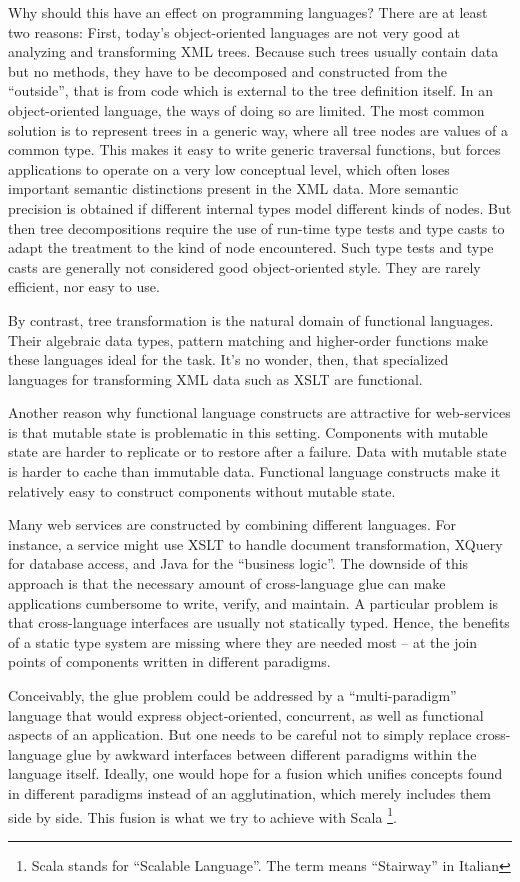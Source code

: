 Why should this have an effect on programming languages? There are at
least two reasons: First, today's object-oriented languages are not
very good at analyzing and transforming XML trees. Because such trees
usually contain data but no methods, they have to be decomposed and
constructed from the ``outside'', that is from code which is external
to the tree definition itself. In an object-oriented language, the
ways of doing so are limited. The most common solution \cite{w3c:dom} is
to represent trees in a generic way, where all tree nodes are values
of a common type.  This makes it easy to write generic traversal
functions, but forces applications to operate on a very low conceptual
level, which often loses important semantic distinctions present in
the XML data.  More semantic precision is obtained if different
internal types model different kinds of nodes.  But then tree
decompositions require the use of run-time type tests and type casts
to adapt the treatment to the kind of node encountered. Such type
tests and type casts are generally not considered good object-oriented
style. They are rarely efficient, nor easy to use.


By contrast, tree transformation is the natural domain of functional
languages. Their algebraic data types, pattern matching and
higher-order functions make these languages ideal for the task. It's
no wonder, then, that specialized languages for transforming XML data
such as XSLT are functional.

Another reason why functional language constructs are attractive for
web-services is that mutable state is problematic in this setting.
Components with mutable state are harder to replicate or to restore
after a failure. Data with mutable state is harder to cache than
immutable data. Functional language constructs make it relatively easy
to construct components without mutable state.

Many web services are constructed by combining different languages.
For instance, a service might use XSLT to handle document
transformation, XQuery for database access, and Java for the
``business logic''.  The downside of this approach is that the
necessary amount of cross-language glue can make applications
cumbersome to write, verify, and maintain. A particular problem is
that cross-language interfaces are usually not statically typed.
Hence, the benefits of a static type system are missing where they are
needed most -- at the join points of components written in different
paradigms.  

Conceivably, the glue problem could be addressed by a ``multi-paradigm''
language that would express object-oriented, concurrent, as well
as functional aspects of an application.  But one needs to be careful
not to simply replace cross-language glue by awkward interfaces
between different paradigms within the language itself.  Ideally, one
would hope for a fusion which unifies concepts found in different
paradigms instead of an agglutination, which merely includes them side
by side.  This fusion is what we try to achieve with Scala
\footnote{Scala stands for ``Scalable Language''. The term means
  ``Stairway'' in Italian}.

